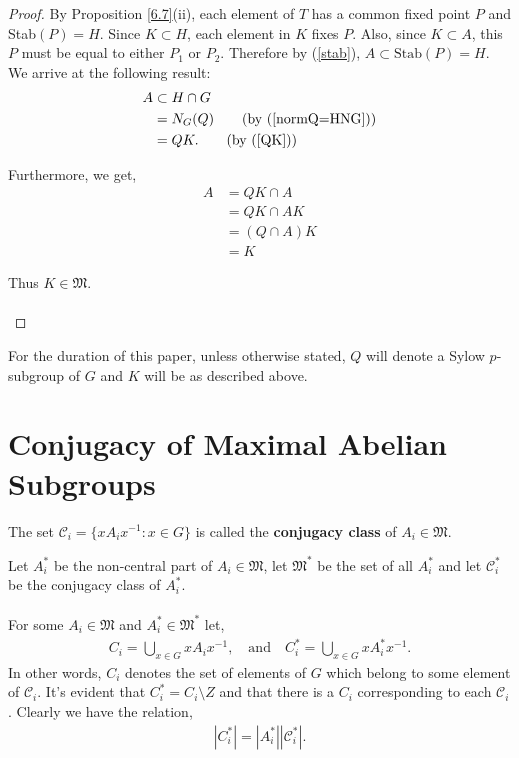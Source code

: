 \begin{proof}
By Proposition \ref{6.7}(ii), each element of $T$ has a common fixed point $P$ and Stab$(P) = H$. Since $K \subset H$, each element in $K$ fixes $P$. Also, since $K \subset A$, this $P$ must be equal to either $P_1$ or $P_2$. Therefore by (\ref{stab}), $A \subset \text{Stab}(P) = H$. We arrive at the following result:
\begin{align*} A &\subset H \cap G 
\\ &= N_G(Q) \tag{by (\ref{normQ=HNG})}
\\ &= QK. \tag{by (\ref{QK})}
\end {align*}

Furthermore, we get,
\begin{align*} A &= QK \cap A
\\ &= QK \cap AK \tag{$K \subset A$ so $A = AK$}
\\ &= (Q \cap A)K
\\ &= K \tag{$Q \cap A = I_G$}
\end{align*}

Thus $K \in \mathfrak{M}$. \\
\\
\end{proof}

For the duration of this paper, unless otherwise stated, $Q$ will denote a Sylow $p$-subgroup of $G$ and $K$ will be as described above. 


\section{Conjugacy of Maximal Abelian Subgroups}

\begin{definition} The set $\mathcal{C}_i = \{ x A_i x^{-1} : x \in G \}$ is called the \textbf{conjugacy class} of $A_i \in \mathfrak{M}$.
\end{definition}

\begin{definition} Let $A_i^*$ be the non-central part of $A_i \in \mathfrak{M}$, let $\mathfrak{M}^*$ be the set of all $A_i^*$ and let $\mathcal{C}_i^*$ be the conjugacy class of $A_i^*$. \\
\\
For some $A_i \in \mathfrak{M}$ and $A_i^* \in \mathfrak{M}^*$ let,
\begin{align*} C_i = \bigcup\limits_{x \in G} x A_i x^{-1}, \quad \text{and} \quad  C_i^* = \bigcup\limits_{x \in G} x A_i^* x^{-1}.
\end{align*}
In other words, $C_i$ denotes the set of elements of $G$ which belong to some element of $\mathcal{C}_i$. It's evident that $C_i^* = C_i \setminus Z$ and that there is a $C_i$ corresponding to each $\mathcal{C}_i$. Clearly we have the relation,
\begin{align}\label{orderorder} |C_i^*| = |A_i^*||\mathcal{C}_i^*|.
\end{align}
\end{definition}

